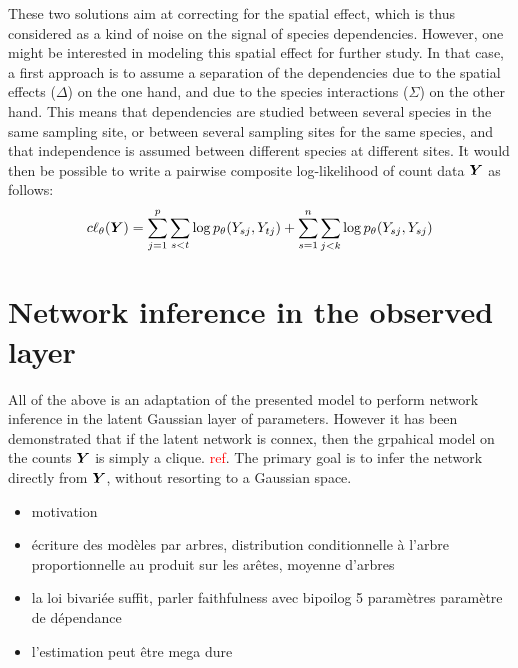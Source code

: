 These two solutions aim at correcting for the spatial effect, which is thus considered as a kind of noise on the signal of species dependencies. However, one might be interested in modeling this spatial effect for further study. In that case, a first approach is to assume a separation of the dependencies due to the spatial effects ($\Delta$) on the one hand, and due to the species interactions ($\Sigma$) on the other hand. This means that dependencies are studied between several species in the same sampling site, or between several sampling sites for the same species, and that independence is assumed between different species at different sites. It would then be possible to write a pairwise composite log-likelihood of count data ${\boldsymbol{Y}}$ as follows:
$$c\ell_\theta({\boldsymbol{Y}}) = \sum_{j=1}^p \sum_{s<t} \log p_\theta(Y_{sj}, Y_{tj})+\sum_{s=1}^n \sum_{j<k} \log p_\theta(Y_{sj}, Y_{sj})$$

 

\section{Network inference in the observed layer}
All of the above is an adaptation of the presented model to perform network inference in the latent Gaussian layer of parameters. However it has been demonstrated that if the latent network is connex, then the grpahical model on the counts ${\boldsymbol{Y}}$ is simply a clique. \textcolor{red}{ref}. The primary goal is to infer the network directly from ${\boldsymbol{Y}}$, without resorting to a Gaussian space.

\begin{itemize}
\item motivation
\item écriture des modèles par arbres, distribution conditionnelle à l'arbre proportionnelle au produit sur les arêtes, moyenne d'arbres
\item la loi bivariée suffit, parler faithfulness avec bipoilog 5 paramètres paramètre de dépendance
\item  l'estimation peut être mega dure
\end{itemize}
